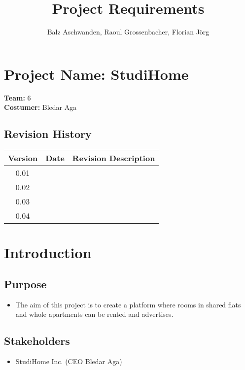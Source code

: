\documentclass[a4paper,11pt]{article}
\title{Project Requirements}
\author{Balz Aschwanden, Raoul Grossenbacher, Florian Jörg}
\begin{document}
\maketitle
\section*{Project Name: StudiHome}

\textbf{Team:} 6 \\
\textbf{Costumer:} Bledar Aga \\

\subsection*{Revision History}
\begin{tabular}{|c|c|c|} \hline
  Version & Date & Revision Description \\ \hline
  0.01 & & \\ \hline
  0.02 & & \\ \hline
  0.03 & & \\ \hline
  0.04 & & \\ \hline
\end{tabular}

\section{Introduction}

\subsection*{Purpose}
\begin{itemize}
  \item The aim of this project is to create a platform where rooms in shared flats and whole apartments can be rented and advertises.
\end{itemize}

\subsection*{Stakeholders}
\begin{itemize}
  \item StudiHome Inc. (CEO Bledar Aga)
\end{itemize}
\end{document}
